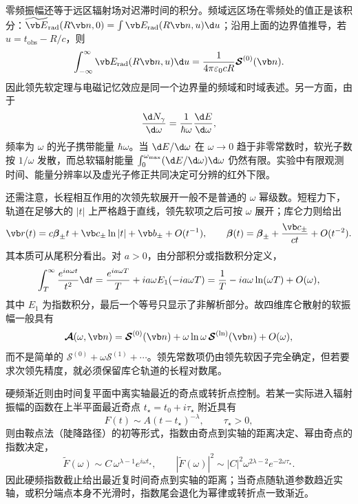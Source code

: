 零频振幅还等于远区辐射场对迟滞时间的积分。频域远区场在零频处的值正是该积分：$\widetilde{\vb E}_{\mathrm{rad}}(R\vb n,0)=\int\vb E_{\mathrm{rad}}(R\vb n,u)\d u$；沿用上面的边界值推导，若 $u=t_{\mathrm{obs}}-R/c$，则
\begin{equation*}
	\int_{-\infty}^{\infty}\vb E_{\mathrm{rad}}(R\vb n,u)\d u
	=\frac{1}{4\pi\varepsilon_0cR}
	\boldsymbol{\mathcal S}^{(0)}(\vb n).
\end{equation*}
因此领先软定理与电磁记忆效应是同一个边界量的频域和时域表述。另一方面，由于
\begin{equation*}
	\frac{\d N_\gamma}{\d\omega}
	=\frac{1}{\hbar\omega}\frac{\d E}{\d\omega},
\end{equation*}
频率为 $\omega$ 的光子携带能量 $\hbar\omega$。当 $\d E/\d\omega$ 在 $\omega\to0$ 趋于非零常数时，软光子数按 $1/\omega$ 发散，而总软辐射能量 $\int_0^{\omega_{\max}}(\d E/\d\omega)\d\omega$ 仍然有限。实验中有限观测时间、能量分辨率以及虚光子修正共同决定可分辨的红外下限。

还需注意，长程相互作用的次领先软展开一般不是普通的 $\omega$ 幂级数。短程力下，轨道在足够大的 $|t|$ 上严格趋于直线，领先软项之后可按 $\omega$ 展开；库仑力则给出
\begin{equation*}
	\vb r(t)=c\boldsymbol\beta_\pm t+\vb c_\pm\ln|t|+\vb b_\pm+O(t^{-1}),
	\qquad
	\boldsymbol\beta(t)=\boldsymbol\beta_\pm+\frac{\vb c_\pm}{ct}+O(t^{-2}).
\end{equation*}
其本质可从尾积分看出。对 $a>0$，由分部积分或指数积分定义，
\begin{equation*}
	\int_T^\infty\frac{e^{ia\omega t}}{t^2}\d t
	=\frac{e^{ia\omega T}}{T}+ia\omega E_1(-ia\omega T)
	=\frac{1}{T}-ia\omega\ln(\omega T)+O(\omega),
\end{equation*}
其中 $E_1$ 为指数积分，最后一个等号只显示了非解析部分。故四维库仑散射的软振幅一般具有
\begin{equation*}
	\boldsymbol{\mathcal A}(\omega,\vb n)
	=\boldsymbol{\mathcal S}^{(0)}(\vb n)
	+\omega\ln\omega\,\boldsymbol{\mathcal S}^{(\ln)}(\vb n)
	+O(\omega),
\end{equation*}
而不是简单的 $\boldsymbol{\mathcal S}^{(0)}+\omega\boldsymbol{\mathcal S}^{(1)}+\cdots$。领先常数项仍由领先软因子完全确定，但若要求次领先精度，就必须保留库仑轨道的长程对数尾。

硬频渐近则由时间复平面中离实轴最近的奇点或转折点控制。若某一实际进入辐射振幅的函数在上半平面最近奇点 $t_\star=t_0+i\tau_\star$ 附近具有
\begin{equation*}
	F(t)\sim A(t-t_\star)^{-\lambda},
	\qquad \tau_\star>0,
\end{equation*}
则由鞍点法（陡降路径）的初等形式，指数由奇点到实轴的距离决定、幂由奇点的指数决定，
\begin{equation*}
	\widetilde F(\omega)
	\sim C\,\omega^{\lambda-1}e^{i\omega t_\star},
	\qquad
	|\widetilde F(\omega)|^2
	\sim |C|^2\omega^{2\lambda-2}e^{-2\omega\tau_\star}.
\end{equation*}
因此硬频指数截止给出最近复时间奇点到实轴的距离；当奇点随轨道参数趋近实轴，或积分端点本身不光滑时，指数尾会退化为幂律或转折点一致渐近。

